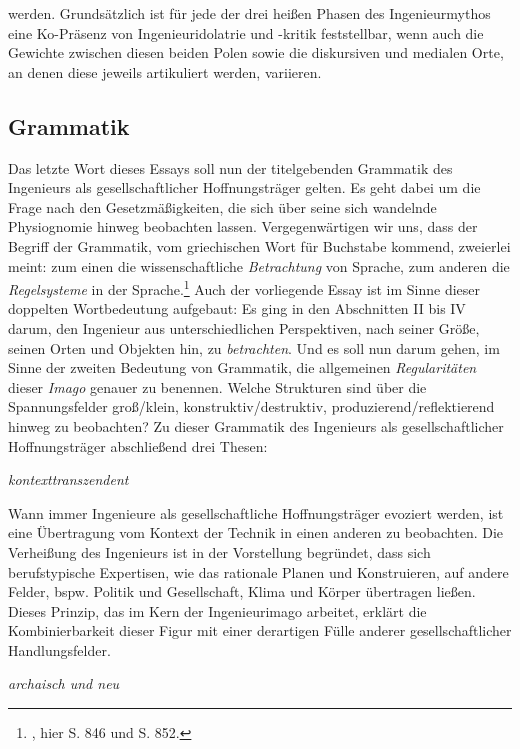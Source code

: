 \documentclass[%
	fontsize=10pt,%
	twoside,%
	headings=optiontoheadandtoc,%
	showtrims]{scrbook}
\renewenvironment{quote}{%
  \addmargin[\genericindent]{0pt}%
  \KOMAoptions{parskip=true}%
  \ifdim\parskip>0pt\else\addvspace{\intextsep}\fi
}{%
  \par
  \endaddmargin\vspace{\intextsep}
}
\begin{document}
werden. Grundsätzlich ist für jede der drei heißen Phasen des Ingenieurmythos eine Ko-Präsenz von Ingenieuridolatrie und -kritik feststellbar, wenn auch die Gewichte zwischen diesen beiden Polen sowie die diskursiven und medialen Orte, an denen diese jeweils artikuliert werden, variieren.
\subsection[Grammatik]{Grammatik}
\par Das letzte Wort dieses Essays soll nun der titelgebenden Grammatik des Ingenieurs als gesellschaftlicher Hoffnungsträger gelten. Es geht dabei um die Frage nach den Gesetzmäßigkeiten, die sich über seine sich wandelnde Physiognomie hinweg beobachten lassen. Vergegenwärtigen wir uns, dass der Begriff der Grammatik, vom griechischen Wort für Buchstabe kommend, zweierlei meint: zum einen die wissenschaftliche \emph{Betrachtung} von Sprache, zum anderen die \emph{Regelsysteme} in der Sprache.\footnote{\cite[][]{behse1974}, hier S. 846 und S. 852.}  Auch der vorliegende Essay ist im Sinne dieser doppelten Wortbedeutung aufgebaut: Es ging in den Abschnitten II bis IV darum, den Ingenieur aus unterschiedlichen Perspektiven, nach seiner Größe, seinen Orten und Objekten hin, zu \emph{betrachten}. Und es soll nun darum gehen, im Sinne der zweiten Bedeutung von Grammatik, die allgemeinen \emph{Regularitäten} dieser \emph{Imago} genauer zu benennen. Welche Strukturen sind über die Spannungsfelder groß/klein, konstruktiv/destruktiv, produzierend/reflektierend hinweg zu beobachten? Zu dieser Grammatik des Ingenieurs als gesellschaftlicher Hoffnungsträger abschließend drei Thesen:\begin{quote}
\par \emph{kontexttranszendent}
\end{quote}
\par Wann immer Ingenieure als gesellschaftliche Hoffnungsträger evoziert werden, ist eine Übertragung vom Kontext der Technik in einen anderen zu beobachten. Die Verheißung des Ingenieurs ist in der Vorstellung begründet, dass sich berufstypische Expertisen, wie das rationale Planen und Konstruieren, auf andere Felder, bspw. Politik und Gesellschaft, Klima und Körper übertragen ließen. Dieses Prinzip, das im Kern der Ingenieurimago arbeitet, erklärt die Kombinierbarkeit dieser Figur mit einer derartigen Fülle anderer gesellschaftlicher Handlungsfelder.\begin{quote}
\par \emph{archaisch und neu}
\end{quote}
\end{document}
